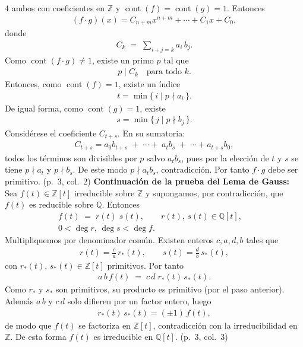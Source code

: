 \documentclass[landscape,a4paper]{article}
\begin{document}
\begin{multicols}{4}
ambos con coeficientes en $\mathbb{Z}$ y $\mathop{\mathrm{cont}}(f) = \mathop{\mathrm{cont}}(g) = 1$. Entonces
\begin{align*}
  (f \cdot g)(x) = C_{n+m} x^{n+m} + \cdots + C_1 x + C_0,
\end{align*}
donde 
\begin{align*}
  C_k \;=\; \sum_{i+j = k} a_i\,b_j.
\end{align*}
Como $\mathop{\mathrm{cont}}(f \cdot g) \neq 1$, existe un primo $p$ tal que 
\begin{align*}
  p \mid C_k \quad \text{para todo }k.
\end{align*}
Entonces, como $\mathop{\mathrm{cont}}(f) = 1$, existe un índice 
\begin{align*}
  t = \min\{\,i \mid p \nmid a_i \,\}.
\end{align*}
De igual forma, como $\mathop{\mathrm{cont}}(g) = 1$, existe 
\begin{align*}
  s = \min\{\,j \mid p \nmid b_j \,\}.
\end{align*}
Considérese el coeficiente $C_{t+s}$. En su sumatoria:
\begin{align*}
  C_{t+s} = a_0 b_{t+s} \;+\; \cdots +\; a_t b_s \;+\; \cdots + a_{t+s} b_0,
\end{align*}
todos los términos son divisibles por $p$ salvo $a_t b_s$, pues por la elección de $t$ y $s$ se tiene $p \nmid a_t$ y $p \nmid b_s$. De este modo $p \nmid a_t b_s$, contradicción. Por tanto $f \cdot g$ debe ser primitivo. (p.~3, col.~2)
\noindent \textbf{Continuación de la prueba del Lema de Gauss:}\\
Sea $f(t) \in \mathbb{Z}[t]$ irreducible sobre $\mathbb{Z}$ y supongamos, por contradicción, que $f(t)$ es reducible sobre $\mathbb{Q}$. Entonces
\begin{align*}
    f(t) \;=\; r(t)\;s(t), 
  \qquad
  r(t),\,s(t) \in \mathbb{Q}[t], 
  \quad\\
  0 < \deg r,\,\deg s < \deg f.
\end{align*}
Multipliquemos por denominador común. Existen enteros $c,a,d,b$ tales que 
\begin{align*}
  r(t) = \frac{c}{a}\,r_*(t),
  \qquad
  s(t) = \frac{d}{b}\,s_*(t),
\end{align*}
con $r_*(t),\,s_*(t) \in \mathbb{Z}[t]$ primitivos. Por tanto 
\begin{align*}
  a\,b\,f(t) \;=\; c\,d\;r_*(t)\,s_*(t).
\end{align*}
Como $r_*$ y $s_*$ son primitivos, su producto es primitivo (por el paso anterior). Además $a\,b$ y $c\,d$ solo difieren por un factor entero, luego 
\begin{align*}
  r_*(t)\,s_*(t) 
  = (\pm 1)\,f(t),
\end{align*}
de modo que $f(t)$ se factoriza en $\mathbb{Z}[t]$, contradicción con la irreducibilidad en $\mathbb{Z}$. De esta forma $f(t)$ es irreducible en $\mathbb{Q}[t]$. (p.~3, col.~3)

\end{multicols}
\end{document}
